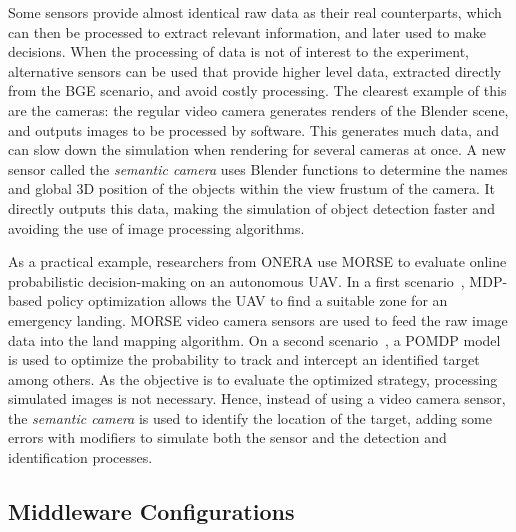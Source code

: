 \documentclass{llncs}
\newcommand{\serge}[1]{\nb{Serge}{blue}{#1}}
\newcommand{\gilberto}[1]{\nb{Gilberto}{red}{#1}}
\begin{document}
Some sensors provide almost identical raw data as their real counterparts,
which can then be processed to extract relevant information,
and later used to make decisions. When the processing of data is not of
interest to the experiment, alternative sensors can be used that provide
higher level data, extracted directly from the BGE scenario, and avoid costly
processing.
The clearest example of this are the cameras: the regular video camera
generates renders of the Blender scene, and outputs images to be processed by
software. This generates much data, and can slow down the simulation when
rendering for several cameras at once. A new sensor called the \emph{semantic
camera} uses Blender functions to determine the names and global 3D position of
the objects within the view frustum of the camera. It directly outputs this
data, making the simulation of object detection faster and
avoiding the use of image processing algorithms.

As a practical example, researchers from ONERA use MORSE to evaluate online probabilistic
decision-making on an autonomous UAV. In a first scenario~\cite{teichteil2011},
MDP-based policy optimization allows the UAV to find a suitable zone for an
emergency landing. MORSE video camera sensors are used to feed the raw image data
into the land mapping algorithm.
On a second scenario~\cite{carvalho2012}, a POMDP model is used to optimize the
probability to track and intercept an identified target among others. As the
objective is to evaluate the optimized strategy, processing
simulated images is not necessary. Hence, instead of using a video camera
sensor, the \emph{semantic camera} is used to identify the location of the target,
adding some errors with modifiers to simulate both the sensor and the detection
and identification processes.

%


\subsection{Middleware Configurations}
\label{section:middlewares}
\end{document}

